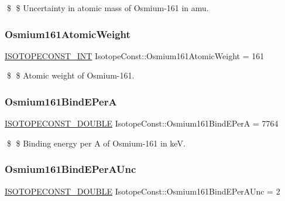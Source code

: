 \$ \$ Uncertainty in atomic mass of Osmium-\/161 in amu. \mbox{\label{group___isotope_const-_osmium-_os161_ga3b2d66d8ebf6af7a173901a51edcc85d}} 
\subsubsection{\texorpdfstring{Osmium161\+Atomic\+Weight}{Osmium161AtomicWeight}}
{\footnotesize\ttfamily \mbox{\hyperlink{group___isotope_const-_macros_ga5f18360b3e99483a35c32d789e62621c}{I\+S\+O\+T\+O\+P\+E\+C\+O\+N\+S\+T\+\_\+\+I\+NT}} Isotope\+Const\+::\+Osmium161\+Atomic\+Weight = 161}

\$ \$ Atomic weight of Osmium-\/161. \mbox{\label{group___isotope_const-_osmium-_os161_ga9671484289bd0a8528b8249b42e0dbbf}} 
\subsubsection{\texorpdfstring{Osmium161\+Bind\+E\+PerA}{Osmium161BindEPerA}}
{\footnotesize\ttfamily \mbox{\hyperlink{group___isotope_const-_macros_ga8f45a7272ce02c0b4c65c44636ed719a}{I\+S\+O\+T\+O\+P\+E\+C\+O\+N\+S\+T\+\_\+\+D\+O\+U\+B\+LE}} Isotope\+Const\+::\+Osmium161\+Bind\+E\+PerA = 7764}

\$ \$ Binding energy per A of Osmium-\/161 in keV. \mbox{\label{group___isotope_const-_osmium-_os161_gac3cb99f46ffb416865635f2b9004af5a}} 
\subsubsection{\texorpdfstring{Osmium161\+Bind\+E\+Per\+A\+Unc}{Osmium161BindEPerAUnc}}
{\footnotesize\ttfamily \mbox{\hyperlink{group___isotope_const-_macros_ga8f45a7272ce02c0b4c65c44636ed719a}{I\+S\+O\+T\+O\+P\+E\+C\+O\+N\+S\+T\+\_\+\+D\+O\+U\+B\+LE}} Isotope\+Const\+::\+Osmium161\+Bind\+E\+Per\+A\+Unc = 2}

